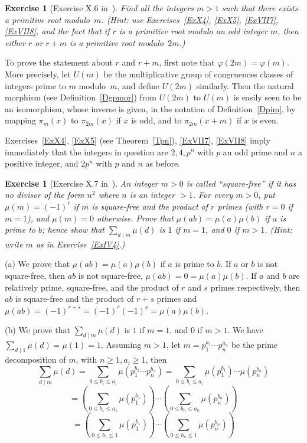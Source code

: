 \documentclass[12pt,letterpaper]{article}
\newtheorem{exer}[thm]{Exercise}
\theoremstyle{definition}
\begin{document}
\begin{exer}[Exercise X.6 in~\cite{weil1979}]
Find all the integers $m>1$ such that there exists a primitive root modulo~$m$. (Hint: use Exercises~\ref{ExX4}, \ref{ExX5}, \ref{ExVII7}, \ref{ExVII8}, and the fact that if $r$ is a primitive root modulo an odd integer $m$, then either $r$ or $r+m$ is a primitive root modulo~$2m$.)
\end{exer}

To prove the statement about $r$ and $r+m$, first note that $\varphi(2m)=\varphi(m)$. More precisely, let $U(m)$ be the multiplicative group of congruences classes of integers prime to $m$ modulo~$m$, and define $U(2m)$ similarly. Then the natural morphism (see Definition~\ref{Dgpmor}) from $U(2m)$ to $U(m)$ is easily seen to be an isomorphism, whose inverse is given, in the notation of Definition~\ref{Dpim}, by mapping $\pi_m(x)$ to $\pi_{2m}(x)$ if $x$ is odd, and to $\pi_{2m}(x+m)$ if $x$ is even. 

Exercises~\ref{ExX4}, \ref{ExX5} (see Theorem~\ref{Tpn}), \ref{ExVII7}, \ref{ExVII8} imply immediately that the integers in question are $2,4,p^n$ with $p$ an odd prime and $n$ a positive integer, and $2p^n$ with $p$ and $n$ as before. 

\begin{exer}[Exercise X.7 in~\cite{weil1979}]\label{ExX7}
An integer $m>0$ is called ``square-free'' if it has no divisor of the form $n^2$ where $n$ is an integer $>1$. For every $m>0$, put $\mu(m)=(-1)^r$ if $m$ is square-free and the product of $r$ primes (with $r=0$ if $m=1$), and $\mu(m)=0$ otherwise. Prove that $\mu(ab)=\mu(a)\mu(b)$ if $a$ is prime to $b$; hence show that $\sum_{d\mid m}\mu(d)$ is $1$ if $m=1$, and $0$ if $m>1$. (Hint: write $m$ as in Exercise~\ref{ExIV4}.) 
\end{exer}

(a) We prove that $\mu(ab)=\mu(a)\mu(b)$ if $a$ is prime to $b$. If $a$ or $b$ is not square-free, then $ab$ is not square-free, $\mu(ab)=0=\mu(a)\mu(b)$. If $a$ and $b$ are relatively prime, square-free, and the product of $r$ and $s$ primes respectively, then $ab$ is square-free and the product of $r+s$ primes and $\mu(ab)=(-1)^{r+s}=(-1)^r(-1)^s=\mu(a)\mu(b)$. 

(b) We prove that $\sum_{d\mid m}\mu(d)$ is $1$ if $m=1$, and $0$ if $m>1$. We have $\sum_{d\mid 1}\mu(d)=\mu(1)=1$. Assuming $m>1$, let $m=p_1^{a_1}\cdots p_n^{a_n}$ be the prime decomposition of $m$, with $n\ge1, a_i\ge1$, then 
$$
\sum_{d\mid m}\mu(d)=\sum_{0\le b_i\le a_i}\mu(p_1^{b_1}\cdots p_n^{b_n})=\sum_{0\le b_i\le a_i}\mu(p_1^{b_1})\cdots \mu(p_n^{b_n})
$$
$$
=\left(\sum_{0\le b_1\le a_1}\mu(p_1^{b_1})\right)\cdots\left(\sum_{0\le b_n\le a_n}\mu(p_n^{b_n})\right)
$$ 
$$
=\left(\sum_{0\le b_1\le 1}\mu(p_1^{b_1})\right)\cdots\left(\sum_{0\le b_n\le 1}\mu(p_n^{b_n})\right)
$$ 
\end{document}
